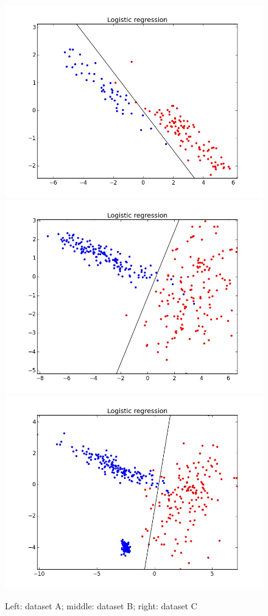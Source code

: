 \documentclass[11pt,a4paper]{article}
\begin{document}
\begin{figure}[H]
\centering
\noindent\includegraphics[scale=0.2]{images/logistic_A.jpeg}
\noindent\includegraphics[scale=0.2]{images/logistic_B.jpeg}
\noindent\includegraphics[scale=0.2]{images/logistic_C.jpeg}
\caption{Left: dataset A; middle: dataset B; right: dataset C}
\end{figure}
\end{document}
